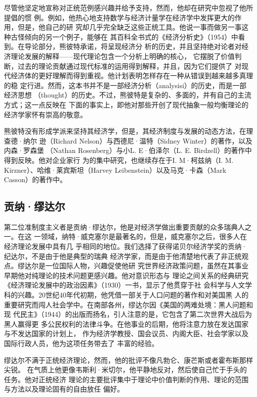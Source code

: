 尽管他坚定地宣称对正统范例感兴趣并给予支持，然而，他却在研究中忽视了他所提倡的惯
例。例如，他热心地支持数学与经济计量学在经济学中发挥更大的作用，但是，他自己的研
究却几乎完全缺乏这些正统工具。他说一事而做另一事这种古怪倾向的另一个例子，能够在
其百科全书式的《经济分析史》（1954）中看到。在导论部分，熊彼特承诺，将呈现经济分
析的历史，并且坚持绝对论者对经济理论发展的解释——现代理论包含一个分析上明确的核心，
它摆脱了价值判断，过去的理论贡献通过现代标准的运用得到解释，并且，因为它们提供了
对现代经济体的更好理解而得到重视。他计划表明怎样存在一种从错误到越来越多真理的稳
定行进。然而，这本书并不是一部经济分析（analysisi）的历史，而是一部经济思想
（thought）的历史。不过，熊彼特是复杂的、多面的，并有自己的主流方式；这一点反映在
下面的事实上，即他对那些开创了现代抽象一般均衡理论的经济学家怀有崇高的敬意。

熊彼特没有形成学派来坚持其经济学，但是，其经济制度与发展的动态方法，在理查德·纳尔
逊（Richard Nelson）与西德尼·温特（Sidney Winter）的著作，以及内森·罗森堡
（Nathan Rosenberg）与小L. E·伯泽尔（L. E. Birdzell）的著作中得到反映。他对企业家行
为的集中研究，也继续存在于I. M·柯兹纳（I. M. Kirzner）、哈维·莱宾斯坦（Harvey
Leibenstein）以及马克·卡森（Mark Casson）的著作中。

\subsection{贡纳·缪达尔}

第二位准制度主义者是贡纳·缪达尔，他是对经济学做出重要贡献的众多瑞典人之一。在这
一领域，纳特·威克塞尔是最著名的，但是，威克塞尔之后，很多人在经济理论发展中具有几
乎相同的地位。我们选择了获得诺贝尔经济学奖的贡纳·纪达尔，不是由于他是典型的瑞典
经济学家，而是由于他清楚地代表了非正统观点。缪达尔是一位国际人物，兴趣促使他研
究世界经济政策问题，虽然在其事业早期他对纯理论的技术问题更感兴趣。他对意识形态与
理论之间关系的经典研究《经济理论发展中的政治因素》（1930）一书，显示了他贯穿于社
会科学与人文学科的兴趣。20世纪40年代初期，他凭借一部关于人口问题的著作和对美国黑
人的重要研究而闯人社会学中。在南部各州，缪达尔因《美国的两难处境：黑人问题和现
代民主》（1944）的出版而扬名，引人注意的是，它包含了第二次世界大战后为黑人赢得更
多公民权利的法律斗争。在他事业的后期，他将注意力放在发达国家与不发达国家的计划上，
作为经济学教授、国会议员、内阁大臣、社会学家以及国际行政人员，他为这项任务带去了
丰富的经验。

缪达尔不满于正统经济理论，然而，他的批评不像凡勃仑、康芒斯或者霍布斯那样尖锐。
在气质上他更像韦斯利·米切尔，他平静地反对，然后使自己忙于手头的任务。他对正统经济
理论的主要批评集中于理论中价值判断的作用、理论的范围与方法以及理论固有的自由放任
偏好。

